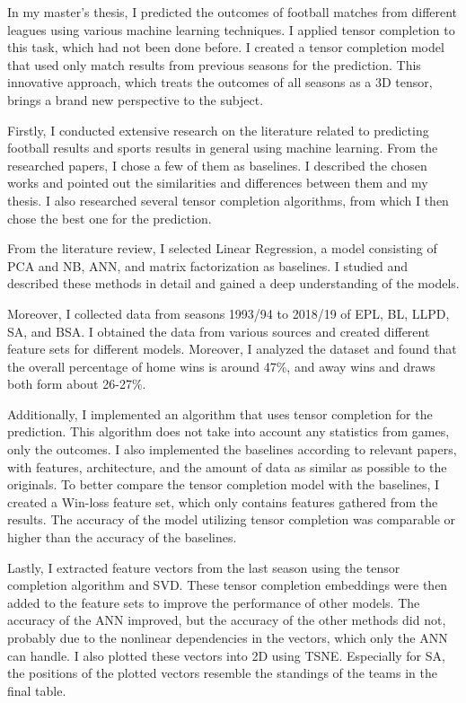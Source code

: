 \documentclass[thesis=M,english]{FITthesis}[2019/12/23]
\begin{document}
\begin{conclusion}
In my master's thesis, I predicted the outcomes of football matches from different leagues using various machine learning techniques. I applied tensor completion to this task, which had not been done before. I created a tensor completion model that used only match results from previous seasons for the prediction. This innovative approach, which treats the outcomes of all seasons as a 3D tensor, brings a brand new perspective to the subject.

Firstly, I conducted extensive research on the literature related to predicting football results and sports results in general using machine learning. From the researched papers, I chose a few of them as baselines. I described the chosen works and pointed out the similarities and differences between them and my thesis. I also researched several tensor completion algorithms, from which I then chose the best one for the prediction.

From the literature review, I selected Linear Regression, a model consisting of PCA and NB, ANN, and matrix factorization as baselines. I studied and described these methods in detail and gained a deep understanding of the models.

Moreover, I collected data from seasons 1993/94 to 2018/19 of EPL, BL, LLPD, SA, and BSA. I obtained the data from various sources and created different feature sets for different models. Moreover, I analyzed the dataset and found that the overall percentage of home wins is around 47\%, and away wins and draws both form about 26-27\%.

Additionally, I implemented an algorithm that uses tensor completion for the prediction. This algorithm does not take into account any statistics from games, only the outcomes. I also implemented the baselines according to relevant papers, with features, architecture, and the amount of data as similar as possible to the originals. To better compare the tensor completion model with the baselines, I created a Win-loss feature set, which only contains features gathered from the results. The accuracy of the model utilizing tensor completion was comparable or higher than the accuracy of the baselines.

Lastly, I extracted feature vectors from the last season using the tensor completion algorithm and SVD. These tensor completion embeddings were then added to the feature sets to improve the performance of other models. The accuracy of the ANN improved, but the accuracy of the other methods did not, probably due to the nonlinear dependencies in the vectors, which only the ANN can handle. I also plotted these vectors into 2D using TSNE. Especially for SA, the positions of the plotted vectors resemble the standings of the teams in the final table.


\end{conclusion}
\end{document}
